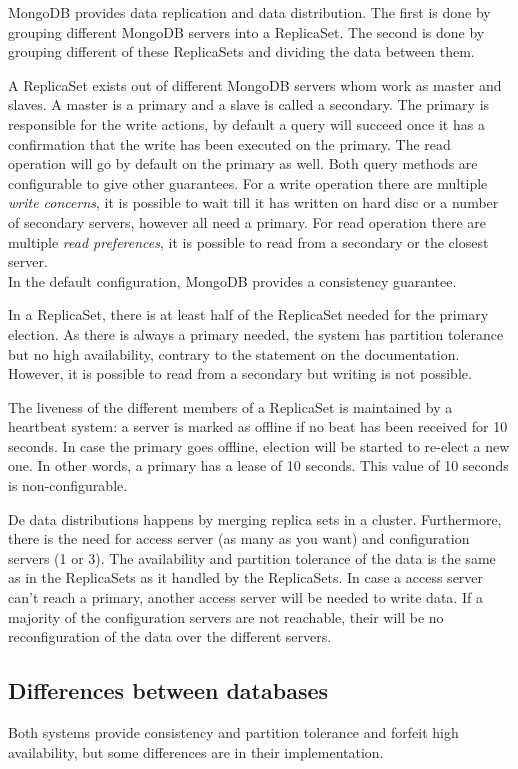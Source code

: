 \documentclass[10pt,conference,letterpaper]{IEEEtran}
\begin{document}
MongoDB provides data replication and data distribution. The first is done by grouping different MongoDB servers into a ReplicaSet. The second is done by grouping different of these ReplicaSets and dividing the data between them.  

A ReplicaSet exists out of different MongoDB servers whom work as master and slaves. A master is a primary and a slave is called a secondary. The primary is responsible for the write actions, by default a query will succeed once it has a confirmation that the write has been executed on the primary. The read operation will go by default on the primary as well. Both query methods are configurable to give other guarantees. For a write operation there are multiple \textit{write concerns}, it is possible to wait till it has written on hard disc or a number of secondary servers, however all need a primary. For read operation there are multiple \textit{read preferences}, it is possible to read from a secondary or the closest server. \\ 
In the default configuration, MongoDB provides a consistency guarantee.

In a ReplicaSet, there is at least half of the ReplicaSet needed for the primary election. As there is always a primary needed, the system has partition tolerance but no high availability, contrary to the statement on the documentation. However, it is possible to read from a secondary but writing is not possible.

The liveness of the different members of a ReplicaSet is maintained by a heartbeat system: a server is marked as offline if no beat has been received for 10 seconds. In case the primary goes offline, election will be started to re-elect a new one. In other words, a primary has a lease of 10 seconds. This value of 10 seconds is non-configurable. 

De data distributions happens by merging replica sets in a cluster. Furthermore, there is the need for access server (as many as you want) and configuration servers (1 or 3). The availability and partition tolerance of the data is the same as in the ReplicaSets as it handled by the ReplicaSets. In case a access server can't reach a primary, another access server will be needed to write data. If a majority of the configuration servers are not reachable, their will be no reconfiguration of the data over the different servers.  

\subsection{Differences between databases} 
Both systems provide consistency and partition tolerance and forfeit high availability, but some differences are in their implementation. 
\end{document}
